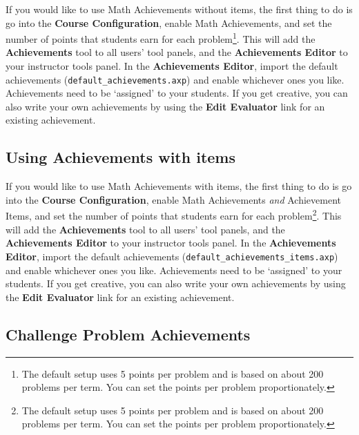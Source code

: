 \documentclass[12pt]{article}
\newcommand{\menu}[1]{\textbf{#1}}
\begin{document}
If you would like to use Math Achievements without items, the first thing to do is go into the \menu{Course Configuration}, enable Math Achievements, and set the number of points that students earn for each problem\footnote{The default setup uses 5 points per problem and is based on about 200 problems per term.
	You can set the points per problem proportionately.
}.
This will add the \menu{Achievements} tool to all users' tool panels, and the \menu{Achievements Editor} to your instructor tools panel.
In the \menu{Achievements Editor}, import the default achievements (\verb=default_achievements.axp=) and enable whichever ones you like.
Achievements need to be `assigned' to your students.
If you get creative, you can also write your own achievements by using the \menu{Edit Evaluator} link for an existing achievement.

\subsection{Using Achievements with items}

If you would like to use Math Achievements with items, the first thing to do is go into the \menu{Course Configuration}, enable Math Achievements \emph{and} Achievement Items, and set the number of points that students earn for each problem\footnote{The default setup uses 5 points per problem and is based on about 200 problems per term.
	You can set the points per problem proportionately.
}.
This will add the \menu{Achievements} tool to all users' tool panels, and the \menu{Achievements Editor} to your instructor tools panel.
In the \menu{Achievements Editor}, import the default achievements (\verb=default_achievements_items.axp=) and enable whichever ones you like.
Achievements need to be `assigned' to your students.
If you get creative, you can also write your own achievements by using the \menu{Edit Evaluator} link for an existing achievement.

\subsection{Challenge Problem Achievements}
\end{document}
